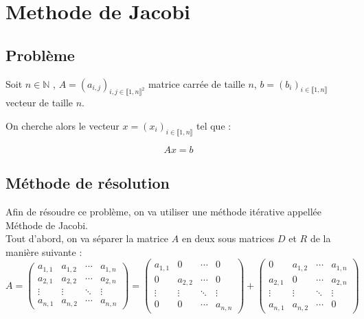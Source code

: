 \documentclass[11pt, a4paper]{article}
\begin{document}
\section{Methode de Jacobi}

\subsection{Problème}

Soit $n \in \mathbb{N}$ , $A = (a_{i,j})_{i,j \in \llbracket 1,n \rrbracket^2}$ matrice carrée de taille $n$, $b = (b_i)_{i \in \llbracket 1,n \rrbracket}$ vecteur de taille $n$.

On cherche alors le vecteur $x = (x_i)_{i \in \llbracket 1,n \rrbracket}$ tel que :

\begin{equation} 
    \label{eq:probleme}
    Ax = b
\end{equation}

\subsection{Méthode de résolution}

Afin de résoudre ce problème, on va utiliser une méthode itérative appellée Méthode de Jacobi.\\

Tout d'abord, on va séparer la matrice $A$ en deux sous matrices $D$ et $R$ de la manière suivante :\\

\[
A = 
\begin{pmatrix}
    a_{1,1} & a_{1,2} & \cdots & a_{1,n} \\
    a_{2,1} & a_{2,2} & \cdots & a_{2,n} \\
    \vdots & \vdots & \ddots & \vdots \\
    a_{n,1} & a_{n,2} & \cdots & a_{n,n} 
\end{pmatrix}
=
\begin{pmatrix}
    a_{1,1} & 0 & \cdots & 0 \\
    0 & a_{2,2} & \cdots & 0 \\
    \vdots  & \vdots  & \ddots & \vdots  \\
    0 & 0 & \cdots & a_{n,n}
\end{pmatrix}
+
\begin{pmatrix}
    0 & a_{1,2} & \cdots & a_{1,n} \\
    a_{2,1} & 0 & \cdots & a_{2,n} \\
    \vdots  & \vdots  & \ddots & \vdots  \\
    a_{n,1} & a_{n,2} & \cdots & 0
\end{pmatrix}
\]\\
\end{document}

